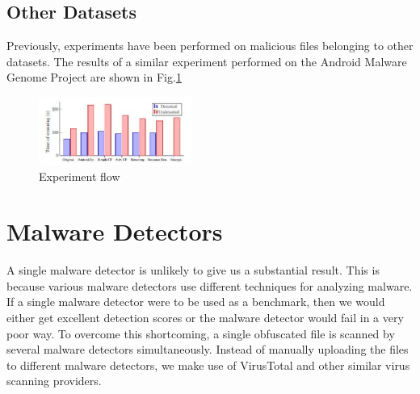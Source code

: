 	\subsection{Other Datasets}
		Previously, experiments have been performed on malicious files belonging to other datasets. The results of a similar experiment performed on the Android
		Malware Genome Project \cite{zhou} are shown in Fig.\ref{genome}\cite{aamo}

		 \begin{figure}
		 	\centering
		 	\includegraphics[width=50mm]{genome.jpg}
		 	\caption{Experiment flow}
		 	\label{genome}
		 \end{figure}
\section{Malware Detectors}
	A single malware detector is unlikely to give us a substantial result. This is because various malware detectors use different techniques for analyzing malware. If a single malware detector were to be used as a benchmark, then we would either get excellent detection scores or the malware detector would fail in a very poor way. To  overcome this shortcoming, a single obfuscated file is scanned by several malware detectors simultaneously.
	Instead of manually uploading the files to different malware detectors, we make use of VirusTotal\cite{virusTotal} and other similar virus scanning providers.
